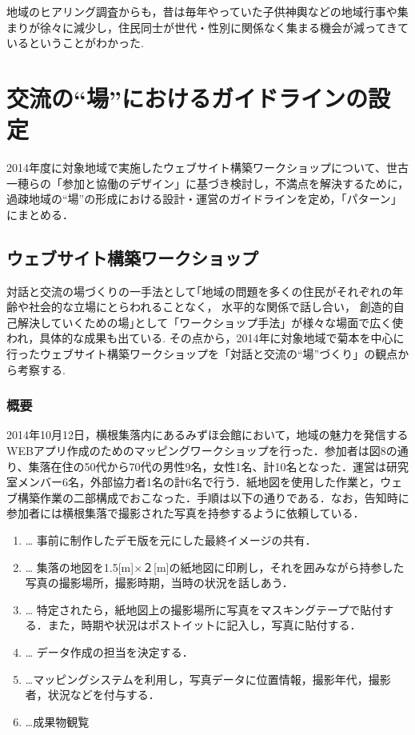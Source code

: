 \documentclass[a4paper]{jsarticle}
\begin{document}
地域のヒアリング調査からも，昔は毎年やっていた子供神輿などの地域行事や集まりが徐々に減少し，住民同士が世代・性別に関係なく集まる機会が減ってきているということがわかった.

\newpage
\section{交流の“場”におけるガイドラインの設定}
2014年度に対象地域で実施したウェブサイト構築ワークショップについて、世古一穂らの「参加と協働のデザイン」\cite{13}に基づき検討し，不満点を解決するために，過疎地域の“場”の形成における設計・運営のガイドラインを定め，「パターン」にまとめる．
\subsection{ウェブサイト構築ワークショップ}
対話と交流の場づくりの一手法として｢地域の問題を多くの住民がそれぞれの年齢や社会的な立場にとらわれることなく， 水平的な関係で話し合い， 創造的自己解決していくための場｣\cite{14}として「ワークショップ手法」が様々な場面で広く使われ，具体的な成果も出ている. その点から，2014年に対象地域で菊本\cite{15}を中心に行ったウェブサイト構築ワークショップを「対話と交流の“場”づくり」の観点から考察する.
\subsubsection{概要}
2014年10月12日，横根集落内にあるみずほ会館において，地域の魅力を発信するWEBアプリ作成のためのマッピングワークショップを行った．参加者は図8の通り、集落在住の50代から70代の男性9名，女性1名、計10名となった．運営は研究室メンバー6名，外部協力者1名の計6名で行う．紙地図を使用した作業と，ウェブ構築作業の二部構成でおこなった．手順は以下の通りである．なお，告知時に参加者には横根集落で撮影された写真を持参するように依頼している．\\
\begin{enumerate}
\item  … 事前に制作したデモ版を元にした最終イメージの共有．
\item  … 集落の地図を1.5[m]×２[m]の紙地図に印刷し，それを囲みながら持参した写真の撮影場所，撮影時期，当時の状況を話しあう．
\item … 特定されたら，紙地図上の撮影場所に写真をマスキングテープで貼付する．また，時期や状況はポストイットに記入し，写真に貼付する．

\item  … データ作成の担当を決定する．

\item …マッピングシステムを利用し，写真データに位置情報，撮影年代，撮影者，状況などを付与する．
\item …成果物観覧
\end{enumerate}
\end{document}
